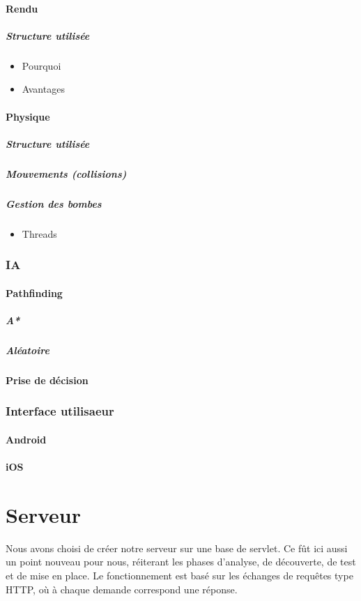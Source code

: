 \documentclass[a4paper,11pt]{report}
\begin{document}
				\paragraph{Rendu}
					\subparagraph{Structure utilisée}
					\begin{itemize}
						\item{Pourquoi}
						\item{Avantages}
					\end{itemize}
				\paragraph{Physique}
					\subparagraph{Structure utilisée}
					\subparagraph{Mouvements (collisions)}
					\subparagraph{Gestion des bombes}
						\begin{itemize}
							\item{Threads}
						\end{itemize}
			\subsubsection{IA}
				\paragraph{Pathfinding}
					\subparagraph{A*}
					\subparagraph{Aléatoire}
				\paragraph{Prise de décision}
			\subsubsection{Interface utilisaeur}
				\paragraph{Android}
				\paragraph{iOS}
		
	\section{Serveur}
		Nous avons choisi de créer notre serveur sur une base de servlet. Ce fût ici
		aussi un point nouveau pour nous, réiterant les phases d'analyse, de
		découverte, de test et de mise en place. Le fonctionnement est basé sur les
		échanges de requêtes type HTTP, où à chaque demande correspond une réponse. 
		
\end{document}
